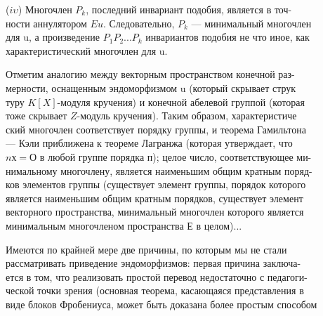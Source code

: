 \documentclass{../template/mai_book}
\begin{document}
\medskip

($\mathit{i} \upsilon $) Многочлен $P_k$, последний инвариант подобия, является в
точ-\\ности аннулятором $Eu$. Следовательно, $P_k$ — минимальный многочлен\\ 
для u, а произведение $P_1P_2... P_k$ инвариантов подобия не что иное, как 
характеристический многочлен для u. 


Отметим аналогию между векторным пространством конечной 
раз-\\мерности, оснащенным эндоморфизмом u (который скрывает 
струк\\туру $K[X]$-модуля кручения) и конечной абелевой группой (которая\\ 
тоже скрывает $Z$-модуль кручения). Таким образом, 
характеристиче\\ский многочлен соответствует порядку группы, и теорема Гамильтона\\ 
— Кэли приближена к теореме Лагранжа (которая утверждает, что\\ 
$nх = О$ в любой группе порядка п); целое число, соответствующее 
ми-\\нимальному многочлену, является наименьшим общим кратным 
поряд-\\ков элементов группы (существует элемент группы, порядок которого\\
является наименьшим общим кратным порядков, существует элемент\\ 
векторного пространства, минимальный многочлен которого является\\ 
минимальным многочленом пространства $Е$ в целом)...

\medskip

Имеются по крайней мере две причины, по которым мы не стали\\ 
рассматривать приведение эндоморфизмов: первая причина 
заключа-\\ется в том, что реализовать простой перевод недостаточно с 
педагоги-\\ческой точки зрения (основная теорема, касающаяся представления в\\ виде блоков Фробениуса, может быть доказана более простым способом

\pagebreak
\end{document}
